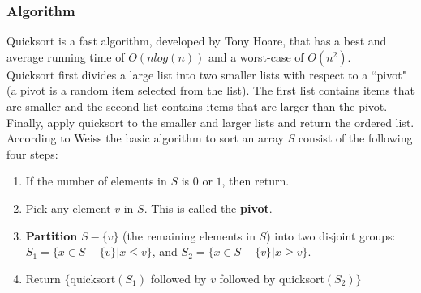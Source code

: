 \documentclass{article}
\begin{document}
      \subsubsection{Algorithm}Quicksort is a fast algorithm, developed
by Tony Hoare, that has a 
best and average running time of $O(nlog(n))$ and a worst-case  of
$O(n^2)$.\\
Quicksort first divides a large list into two smaller lists with respect
to a ``pivot" (a pivot is a random item selected from the list). The 
first list contains items that are smaller and the second list contains 
items that are larger than the pivot. Finally, apply quicksort to the
smaller and larger lists and return the ordered list. 
According to Weiss\cite{weiss}  the basic algorithm to sort an array $S$ 
consist of the following four steps:
\begin{enumerate}
\item If the number of elements in $S$ is $0$ or $1$, then return.
\item Pick any element $v$ in $S$. This is called the \textbf{pivot}.
\item \textbf{Partition} $S - \{v\}$ (the remaining elements in $S$)
into two disjoint groups: $S_1 = \{x \in S - \{v\}|x\leq v\}$, and $S_2
= \{x \in S - \{v\}|x \geq v\}$.
\item Return $\{$quicksort$(S_1)$ followed by $v$ followed by
quicksort$(S_2)\}$
\end{enumerate}
\end{document}
